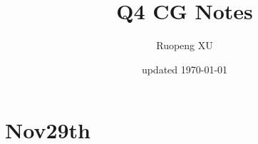 \documentclass[UTF8]{ctexart}
\begin{document}
%



%

\title{Q4 CG Notes}
\author{Ruopeng XU}
\date{updated \today}

\maketitle

%











%

\section{Nov29th}
\end{document}
